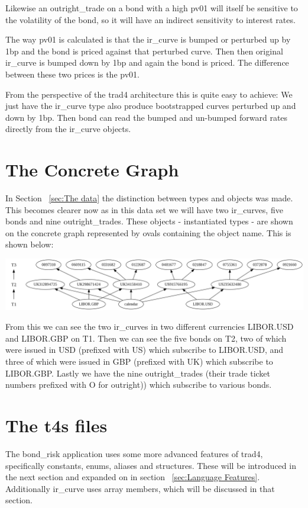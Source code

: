 \documentclass{report}
\begin{document}
Likewise an outright_trade on a bond with a high pv01 will itself be sensitive to the volatility of the bond, so it will have an indirect sensitivity to interest rates.

The way pv01 is calculated is that the ir_curve is bumped or perturbed up by 1bp and the bond is priced against that perturbed curve. Then then original ir_curve is bumped down by 1bp and again the bond is priced. The difference between these two prices is the pv01.

From the perspective of the trad4 architecture this is quite easy to achieve: We just have the ir_curve type also produce bootstrapped curves perturbed up and down by 1bp. Then bond can read the bumped and un-bumped forward rates directly from the ir_curve objects. 

\section{The Concrete Graph}

In Section ~\ref{sec:The data} the distinction between types and objects was made. This becomes clearer now as in this data set we will have two ir_curves, five bonds and nine outright_trades. These objects - instantiated types - are shown on the concrete graph represented by ovals containing the object name. This is shown below:

\includegraphics[scale=0.25]{bondrisksimpleconcrete.png}

From this we can see the two ir_curves in two different currencies LIBOR.USD and LIBOR.GBP on T1. Then we can see the five bonds on T2, two of which were issued in USD (prefixed with US) which subscribe to LIBOR.USD, and three of which were issued in GBP (prefixed with UK) which subscribe to LIBOR.GBP. Lastly we have the nine outright_trades (their trade ticket numbers prefixed with O for outright)) which subscribe to various bonds.

\section{The t4s files}

The bond_risk application uses some more advanced features of trad4, specifically constants, enums, aliases and structures. These will be introduced in the next section and expanded on in section ~\ref{sec:Language Features}. Additionally ir_curve uses array members, which will be discussed in that section.
\end{document}
